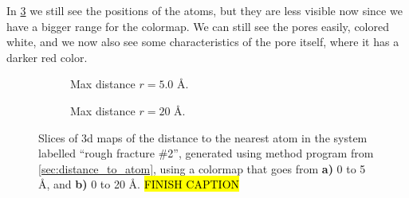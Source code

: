 In \cref{fig:distance_to_atom_r20} we still see the positions of the atoms, but they are less visible now since we have a bigger range for the colormap. We can still see the pores easily, colored white, and we now also see some characteristics of the pore itself, where it has a darker red color.
%
%
%
\begin{figure}[htpb]%
    \centering%
    \setlength{\myfigwidth}{0.9\textwidth}%
    \begin{subfigure}[b]{\myfigwidth}%
        \caption{Max distance $r=5.0$ \AA.%
        \label{fig:distance_to_atom_r05}}%
    \end{subfigure}%
    \vspace{10pt}
    \begin{subfigure}[b]{\myfigwidth}%
        \caption{Max distance $r=20$ \AA.%
        \label{fig:distance_to_atom_r20}}%
    \end{subfigure}%
    \caption{%
        Slices of 3d maps of the distance to the nearest atom in the system labelled ``rough fracture \#2'', generated using method program from \cref{sec:distance_to_atom}, using a colormap that goes from \textbf{a)} 0 to 5 \AA, and \textbf{b)} 0 to 20 \AA. \hl{FINISH CAPTION}%
    }%
\end{figure}%



